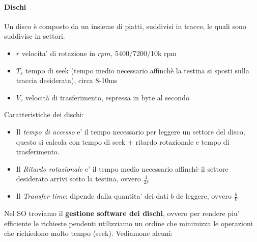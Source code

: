 \documentclass[a4paper,12pt]{article}
\begin{document}
\paragraph{Dischi} Un disco è composto da un insieme di piatti, suddivisi in tracce, le quali sono suddivise in settori.
\begin{itemize}
  \item $r$ velocita' di rotazione in $rpm$, 5400/7200/10k rpm
  \item $T_s$ tempo di seek (tempo medio necessario affinchè la testina si sposti sulla traccia desiderata), circa 8-10ms
  \item $V_r$ velocità di trasferimento, espressa in byte al secondo
\end{itemize}
Caratteristiche dei dischi:
\begin{itemize}
  \item Il \textit{tempo di accesso} e' il tempo necessario per leggere un settore del disco, questo si calcola con tempo di seek + ritardo rotazionale e tempo di trasferimento.\\
  \item Il \textit{Ritardo rotazionale} e' il tempo medio necessario affinchè il settore desiderato arrivi sotto la testina, ovvero $\frac{1}{2r}$
  \item Il \textit{Transfer time}: dipende dalla quantita' dei dati $b$ de leggere, ovvero $\frac{b}{V}$
\end{itemize}
Nel SO troviamo il \textbf{gestione software dei dischi}, ovvero per rendere piu' efficiente le richieste pendenti utilizziamo un ordine che minimizza le operazioni che richiedono molto tempo (seek). Vediamone alcuni:
\end{document}
